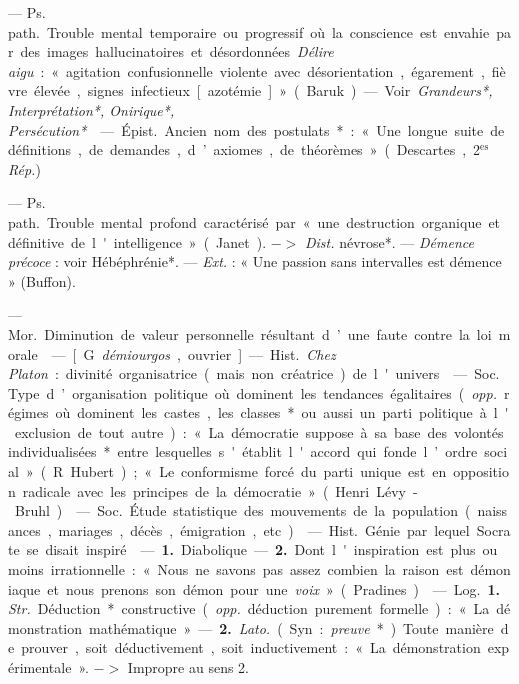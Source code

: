 \begin{itemize}[leftmargin=1cm, label=, itemsep=1pt]
 — \si{Ps. path.} Trouble mental
temporaire ou progressif où la conscience est envahie par des images
hallucinatoires et désordonnées. {\it Délire aigu} : « agitation confusionnelle
violente avec désorientation, égarement, fièvre élevée, signes infectieux [azotémie] » (Baruk). — Voir
{\it Grandeurs*, Interprétation*, Onirique*, Persécution*}.

 — \si{Épist.} Ancien nom des postulats* : « Une longue suite de
définitions, de demandes, d’axiomes, de théorèmes... » (Descartes,
2$^\text{es}$ {\it Rép.})

 — \si{Ps. path.} Trouble mental
profond caractérisé par « une destruction organique et définitive de
l'intelligence » (Janet). $->$ {\it Dist.}
névrose*. — {\it Démence précoce} : voir
Hébéphrénie*. — {\it Ext.} : « Une passion sans intervalles est démence »
(Buffon).

 — \si{Mor.} Diminution de
valeur personnelle résultant d’une
faute contre la loi morale.

 — [G. {\it démiourgos}, ouvrier]
— \si{Hist.} {\it Chez Platon} : divinité organisatrice
(mais non créatrice) de l'univers.

 — \si{Soc.} Type d’organisation politique où dominent les
tendances égalitaires ({\it opp.} régimes
où dominent les castes, les classes*
ou aussi un parti politique à l'exclusion de tout autre) : « La démocratie suppose à sa base des volontés
individualisées* entre lesquelles
s'établit l'accord qui fonde l’ordre
social » (R. Hubert); « Le conformisme forcé du parti unique est
en opposition radicale avec les principes de la démocratie » (Henri
Lévy-Bruhl).

 — \si{Soc.} Étude statistique des mouvements de la population (naissances, mariages, décès, émigration, etc.).

 — \si{Hist.} Génie par
lequel Socrate se disait inspiré.

 — {\bf 1.} Diabolique. — {\bf 2.}
Dont l'inspiration est plus ou moins
irrationnelle : « Nous ne savons pas
assez combien la raison est démoniaque et nous prenons son démon
pour une {\it voix} » (Pradines).

 — \si{Log.} {\bf 1.} {\it Str.} Déduction* constructive ({\it opp.} déduction
purement formelle) : « La démonstration mathématique ». — {\bf 2.} {\it Lato.}
(Syn. : {\it preuve}*). Toute manière de
prouver, soit déductivement, soit
inductivement : « La démonstration
expérimentale ». $->$ Impropre au
sens 2.


\end{itemize}
